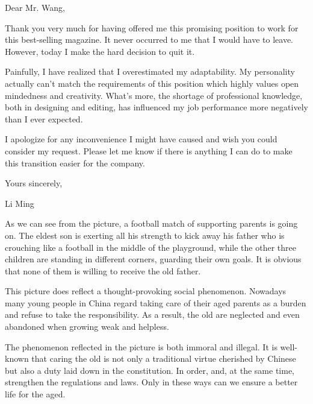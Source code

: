Dear Mr. Wang,

Thank you very much for having offered me this promising position to work for this best-selling magazine. It never occurred to me that I would have to leave. However, today I make the hard decision to quit it.

Painfully, I have realized that I overestimated my adaptability. My personality actually can't match the requirements of this position which highly values open mindedness and creativity. What's more, the shortage of professional knowledge, both in designing and editing, has influenced my job performance more negatively than I ever expected.

I apologize for any inconvenience I might have caused and wish you could consider my request. Please let me know if there is anything I can do to make this transition easier for the company.

\begin{flushright}Yours sincerely,

Li Ming\end{flushright}

As we can see from the picture, a football match of supporting parents is going on. The eldest son is exerting all his strength to kick away his father who is crouching like a football in the middle of the playground, while the other three children are standing in different corners, guarding their own goals. It is obvious that none of them is willing to receive the old father.

This picture does reflect a thought-provoking social phenomenon. Nowadays many young people in China regard taking care of their aged parents as a burden and refuse to take the responsibility. As a result, the old are neglected and even abandoned when growing weak and helpless.

The phenomenon reflected in the picture is both immoral and illegal. It is well-known that caring the old is not only a traditional virtue cherished by Chinese but also a duty laid down in the constitution. In order,  and, at the same time, strengthen the regulations and laws. Only in these ways can we ensure a better life for the aged.